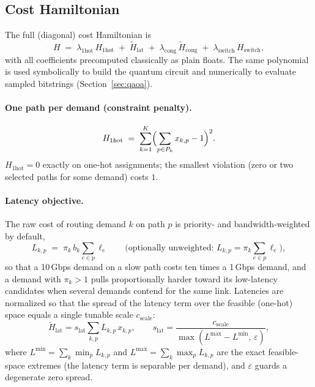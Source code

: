 \documentclass[11pt]{article}
\newcommand{\onehot}{\mathrm{1hot}}
\newcommand{\lat}{\mathrm{lat}}
\newcommand{\cng}{\mathrm{cong}}
\newcommand{\switch}{\mathrm{switch}}
\begin{document}
\subsection{Cost Hamiltonian}

The full (diagonal) cost Hamiltonian is
\begin{equation}
  \label{eq:H}
  H \;=\; \lambda_{\onehot}\, H_{\onehot}
     \;+\; \widetilde{H}_{\lat}
     \;+\; \lambda_{\cng}\, \widetilde{H}_{\cng}
     \;+\; \lambda_{\switch}\, H_{\switch},
\end{equation}
with all coefficients precomputed classically as plain floats. The same
polynomial is used symbolically to build the quantum circuit and numerically
to evaluate sampled bitstrings (Section~\ref{sec:qaoa}).

\paragraph{One path per demand (constraint penalty).}
\begin{equation}
  \label{eq:onehot}
  H_{\onehot} \;=\; \sum_{k=1}^{K} \Bigl( \sum_{p \in P_k} x_{k,p} - 1 \Bigr)^{2}.
\end{equation}
$H_{\onehot} = 0$ exactly on one-hot assignments; the smallest violation
(zero or two selected paths for some demand) costs $1$.

\paragraph{Latency objective.}
The raw cost of routing demand $k$ on path $p$ is priority- and
bandwidth-weighted by default,
\begin{equation}
  L_{k,p} \;=\; \pi_k\, b_k \sum_{e \in p} \ell_e
  \qquad \text{(optionally unweighted: } L_{k,p} = \pi_k \textstyle\sum_{e\in p}\ell_e\text{)},
\end{equation}
so that a 10\,Gbps demand on a slow path costs ten times a 1\,Gbps demand, and
a demand with $\pi_k > 1$ pulls proportionally harder toward its low-latency
candidates when several demands contend for the same link.
Latencies are normalized so that the spread of the latency term over the
feasible (one-hot) space equals a single tunable scale $c_{\mathrm{scale}}$:
\begin{equation}
  \label{eq:latnorm}
  \widetilde{H}_{\lat} = s_{\lat} \sum_{k,p} L_{k,p}\, x_{k,p},
  \qquad
  s_{\lat} = \frac{c_{\mathrm{scale}}}{\max(L^{\max} - L^{\min},\, \varepsilon)},
\end{equation}
where $L^{\min} = \sum_k \min_{p} L_{k,p}$ and
$L^{\max} = \sum_k \max_{p} L_{k,p}$ are the exact feasible-space extremes
(the latency term is separable per demand), and $\varepsilon$ guards a
degenerate zero spread.
\end{document}

